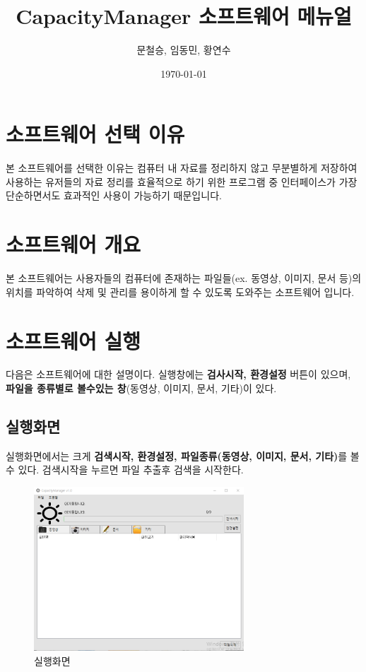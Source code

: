\documentclass[a4paper, 13pt]{article} %
\title{CapacityManager 소프트웨어 메뉴얼}
\author{문철승, 임동민, 황연수}
\date{\today}
\begin{document}
	
	\LARGE \maketitle
	
	\clearpage
	
	\normalsize
	\section{소프트웨어 선택 이유}
	본 소프트웨어를 선택한 이유는 컴퓨터 내 자료를 정리하지 않고 무분별하게 저장하여 사용하는 유저들의 자료 정리를 효율적으로 하기 위한 프로그램 중 인터페이스가 가장 단순하면서도 효과적인 사용이 가능하기 때문입니다.
	
	\section{소프트웨어 개요}
	본 소프트웨어는 사용자들의 컴퓨터에 존재하는 파일들(ex. 동영상, 이미지, 문서 등)의 위치를 파악하여 삭제 및 관리를 용이하게 할 수 있도록 도와주는 소프트웨어 입니다.
	
	\section{소프트웨어 실행}
	다음은 소프트웨어에 대한 설명이다.  실행창에는  \textbf{검사시작, 환경설정} 버튼이 있으며,  \textbf{파일을 종류별로 볼수있는 창}(동영상, 이미지, 문서, 기타)이 있다. 
		\subsection{실행화면}
		실행화면에서는 크게 \textbf{검색시작, 환경설정, 파일종류(동영상, 이미지, 문서, 기타)}를 볼수 있다.
		검색시작을 누르면 파일 추출후 검색을 시작한다.
	\begin{figure}[h]
		\centering
		\includegraphics[width=0.7\textwidth]{Figures/exe2}
		\caption{실행화면}
		\label{fig:exe}
	\end{figure}
\end{document}
